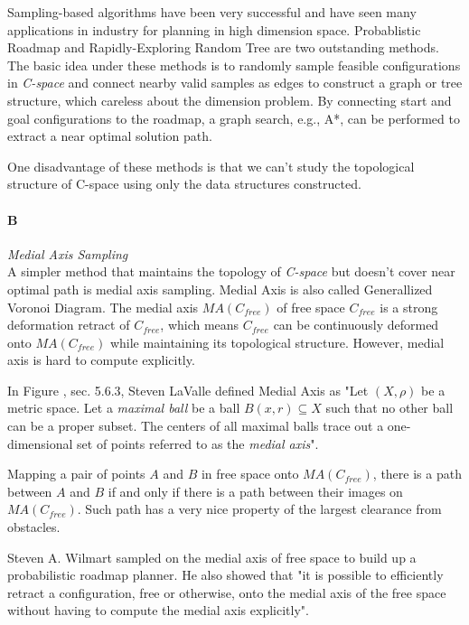\documentclass[11pt]{article}
\begin{document}
\indent Sampling-based algorithms have been very successful and have seen many applications in industry for planning in high dimension space. Probablistic Roadmap \cite{PRM} and Rapidly-Exploring Random Tree \cite{RRT} are two outstanding methods. The basic idea under these methods is to randomly sample feasible configurations in \emph{C-space} and connect nearby valid samples as edges to construct a graph or tree structure, which careless about the dimension problem. By connecting start and goal configurations to the roadmap, a graph search, e.g., A*, can be performed to extract a near optimal solution path.

\indent One disadvantage of these methods is that we can't study the topological structure of C-space using only the data structures constructed.

\paragraph{B} \emph{Medial Axis Sampling} \hfill \\
\indent A simpler method that maintains the topology of \emph{C-space} but doesn't cover near optimal path is medial axis sampling. Medial Axis is also called Generallized Voronoi Diagram. The medial axis $MA(C_{free})$ of free space $C_{free}$ is a strong deformation retract of $C_{free}$, which means $C_{free}$ can be continuously deformed onto $MA(C_{free})$ while maintaining its topological structure. However, medial axis is hard to compute explicitly.

\indent In Figure \cite{Book}, sec. 5.6.3, Steven LaValle defined Medial Axis as "Let $(X, \rho)$ be a metric space. Let a \emph{maximal ball} be a ball $B(x,r) \subseteq X$ such that no other ball can be a proper subset. The centers of all maximal balls trace out a one-dimensional set of points referred to as the \emph{medial axis}".

\indent Mapping a pair of points $A$ and $B$ in free space onto $MA(C_{free})$, there is a path between $A$ and $B$ if and only if there is a path between their images on $MA(C_{free})$. Such path has a very nice property of the largest clearance from obstacles.

\indent Steven A. Wilmart \cite{MAPRM} sampled on the medial axis of free space to build up a probabilistic roadmap planner. He also showed that "it is possible to efficiently retract a configuration, free or otherwise, onto the medial axis of the free space without having to compute the medial axis explicitly".
\end{document}
